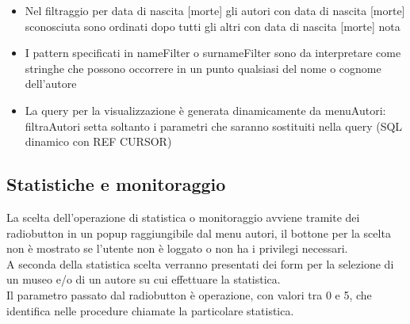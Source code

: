 \begin{itemize}
\begin{itemize}
		\item Nel filtraggio per data di nascita [morte] gli autori con data di nascita [morte] sconosciuta sono ordinati dopo tutti gli altri con data di nascita [morte] nota
		\item I pattern specificati in nameFilter o surnameFilter sono da interpretare come stringhe che possono occorrere in un punto qualsiasi del nome o cognome dell'autore
		\item La query per la visualizzazione è generata dinamicamente da menuAutori: filtraAutori setta soltanto i parametri che saranno sostituiti nella query (SQL dinamico con REF CURSOR)
	\end{itemize}
\end{itemize}

\subsection{Statistiche e monitoraggio}
La scelta dell'operazione di statistica o monitoraggio avviene tramite dei radiobutton in un popup raggiungibile dal menu autori, il bottone per la scelta non è mostrato
se l'utente non è loggato o non ha i privilegi necessari.\\
A seconda della statistica scelta verranno presentati dei form per la selezione di un museo e/o di un autore su cui effettuare la statistica.\\
Il parametro passato dal radiobutton è operazione, con valori tra 0 e 5, che identifica nelle procedure chiamate la particolare statistica.\\

